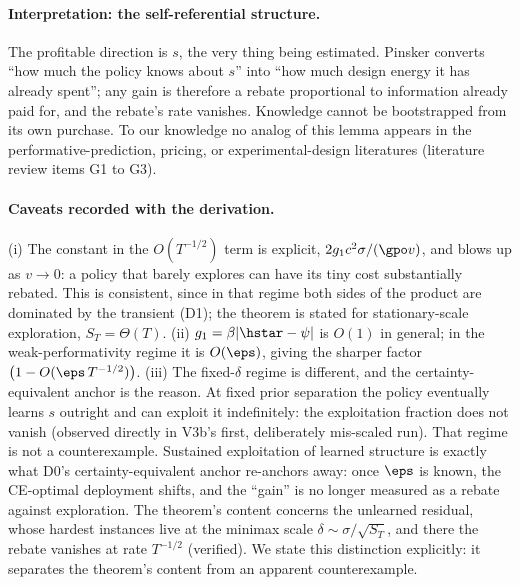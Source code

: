 \paragraph{Interpretation: the self-referential structure.}
The profitable direction is $s$, the very thing being estimated. Pinsker
converts ``how much the policy knows about $s$'' into ``how much design
energy it has already spent''; any gain is therefore a rebate proportional
to information already paid for, and the rebate's rate vanishes. Knowledge
cannot be bootstrapped from its own purchase. To our knowledge no analog of
this lemma appears in the performative-prediction, pricing, or
experimental-design literatures (literature review items G1 to G3).

\paragraph{Caveats recorded with the derivation.}
(i) The constant in the $O(T^{-1/2})$ term is explicit,
$2 g_1 c^2 \sigma/(\gpo v)$, and blows up as $v\to 0$: a policy that
barely explores can have its tiny cost substantially rebated. This is
consistent, since in that regime both sides of the product are dominated by
the transient (D1); the theorem is stated for stationary-scale exploration,
$S_T=\Theta(T)$.
(ii) $g_1=\beta|\hstar-\psi|$ is $O(1)$ in general; in the
weak-performativity regime it is $O(\eps)$, giving the sharper factor
$\big(1-O(\eps\, T^{-1/2})\big)$.
(iii) The fixed-$\delta$ regime is different, and the certainty-equivalent
anchor is the reason. At fixed prior separation the policy eventually learns
$s$ outright and can exploit it indefinitely: the exploitation fraction does
not vanish (observed directly in V3b's first, deliberately mis-scaled run).
That regime is not a counterexample. Sustained exploitation of learned
structure is exactly what D0's certainty-equivalent anchor re-anchors away:
once $\eps$ is known, the CE-optimal deployment shifts, and the ``gain'' is
no longer measured as a rebate against exploration. The theorem's content
concerns the unlearned residual, whose hardest instances live at the minimax
scale $\delta\sim\sigma/\sqrt{S_T}$, and there the rebate vanishes at rate
$T^{-1/2}$ (verified). We state this distinction explicitly: it separates
the theorem's content from an apparent counterexample.

